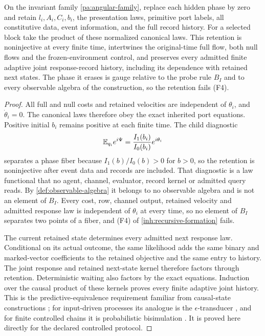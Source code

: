 On the invariant family \cref{pa:angular-family}, replace each hidden phase by zero and retain $l_i,A_i,C_i,b_i$, the presentation laws, primitive port labels, all constitutive data, event information, and the full record history. For a selected block take the product of these normalized canonical laws. This retention is noninjective at every finite time, intertwines the original-time full flow, both null flows and the frozen-environment control, and preserves every admitted finite adaptive joint response-record history, including its dependence with retained next states. The phase it erases is gauge relative to the probe rule $B_I$ and to every observable algebra of the construction, so the retention fails (F4).
\begin{proof}
All full and null costs and retained velocities are independent of $\theta_i$, and $\dot\theta_i=0$. The canonical laws therefore obey the exact inherited port equations. Positive initial $b_i$ remains positive at each finite time. The child diagnostic
\begin{equation}
 \mathbb E_{q_i}e^{i\Psi}=\frac{I_1(b_i)}{I_0(b_i)}e^{i\theta_i}
 \label{pa:hidden-diagnostic}
\end{equation}
separates a phase fiber because $I_1(b)/I_0(b)>0$ for $b>0$, so the retention is noninjective after event data and records are included. That diagnostic is a law functional that no agent, channel, evaluator, record kernel or admitted query reads. By \cref{def:observable-algebra} it belongs to no observable algebra and is not an element of $B_I$. Every cost, row, channel output, retained velocity and admitted response law is independent of $\theta_i$ at every time, so no element of $B_I$ separates two points of a fiber, and (F4) of \cref{inh:recursive-formation} fails.

The current retained state determines every admitted next response law. Conditional on its actual outcome, the same likelihood adds the same binary and marked-vector coefficients to the retained objective and the same entry to history. The joint response and retained next-state kernel therefore factors through retention. Deterministic waiting also factors by the exact equations. Induction over the causal product of these kernels proves every finite adaptive joint history. This is the predictive-equivalence requirement familiar from causal-state constructions \citep{ShaliziCrutchfield2001}; for input-driven processes its analogue is the $\epsilon$-transducer \citep{BarnettCrutchfield2015}, and for finite controlled chains it is probabilistic bisimulation \citep{LarsenSkou1991}. It is proved here directly for the declared controlled protocol.
\end{proof}

